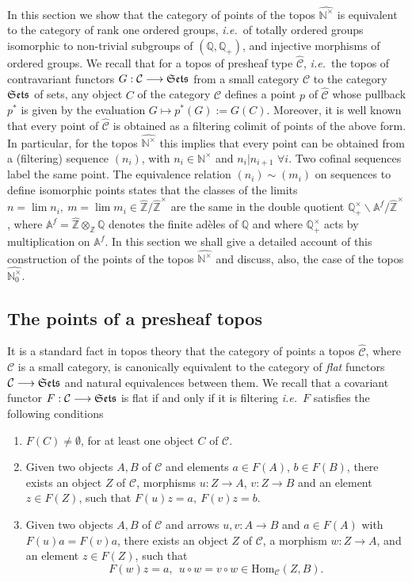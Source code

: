 \documentclass[noams,lp]{compositio}
\def\Hom{{\rm Hom}}
\def\A{{\mathbb A}}
\def\N{{\mathbb N}}
\def\Q{{\mathbb Q}}
\def\Z{{\mathbb Z}}
\def\cC{{\mathcal C}}
\newcommand{\ie}{{\it i.e.\/}\ }
\def\Hom {{\mbox{Hom}}}
\def\Se{\frak{ Sets}}
\def\nt{\N^{\times}}
\def\wnt{{\widehat{\N^{\times}}}}
\def\nto{\N_0^{\times}}
\def\wnto{{\widehat{\nto}}}
\def\hatz{{\hat\Z^\times}}
\begin{document}
In this section we show that the category of  points of the topos $\wnt$ is equivalent to the category of rank one ordered groups, \ie of totally ordered groups isomorphic to non-trivial subgroups of   $(\Q,\Q_+)$, and injective morphisms of ordered groups. We recall that for a topos of presheaf type $\hat\cC$, \ie the topos of contravariant functors $G:\cC\longrightarrow\Se$ from a small category $\cC$ to the category $\Se$ of sets, any object $C$ of the category $\cC$ defines a point $p$ of $\hat\cC$ whose pullback  $p^*$ is given  by the evaluation  $G\mapsto p^*(G):= G(C)$. Moreover, it is well known that every point of $\hat\cC$ is obtained as a filtering colimit of points of the above form. In particular, for the topos $\wnt$ this implies that every point can be obtained from  a (filtering) sequence $(n_i)$, with $n_i\in\nt$ and $n_i\vert n_{i+1}$ $\forall i$. Two cofinal sequences label the same point. The equivalence   relation $(n_i)\sim (m_i)$ on  sequences  to define isomorphic points states that the classes of the limits 
$n=\lim n_i, ~m=\lim m_i \in \hat\Z/\hatz$ are the same in the double quotient $\Q_+^\times\backslash\A^f/\hat\Z^\times
$, where $\A^f= \hat\Z\otimes_\Z\Q$ denotes the finite ad\`eles of $\Q$ and where $\Q_+^\times$ acts by multiplication on $\A^f$. In this section we shall give  a detailed account of this construction of the points of the topos $\wnt$ and discuss, also, the case of the topos $\wnto$.


  \subsection{The points of a presheaf topos} \label{preshtop}
 It is a standard fact in topos theory that the category of points a topos  $\hat \cC$, where $\cC$ is a small category,  is canonically equivalent to the category of {\em flat} functors $\cC\longrightarrow \Se$ and natural equivalences between them. 
We recall that a covariant functor $F:\cC\longrightarrow \Se$ is flat if and only if it is filtering \ie $F$ satisfies the following conditions
\begin{enumerate}
\item $F(C)\neq \emptyset$, for at least one object $C$ of $\cC$.
\item Given two objects $A,B$ of $\cC$ and elements $a\in F(A)$, $b\in F(B)$, there exists
an object $Z$ of $\cC$, morphisms $u:Z\to A$, $v:Z\to B$ and an element $z\in F(Z)$, such that 
$
F(u)z=a, \   F(v)z=b.
$
\item Given two objects $A,B$ of $\cC$ and arrows $u,v:A\to B$ and $a\in F(A)$ with $F(u)a=F(v)a$, there
exists an object $Z$ of $\cC$, a morphism $w:Z\to A$,  and an element $z\in F(Z)$, such that 
$$
F(w)z=a, \  \  u\circ w=v\circ w\in \Hom_\cC(Z,B).
$$
\end{enumerate}
 
\end{document}
